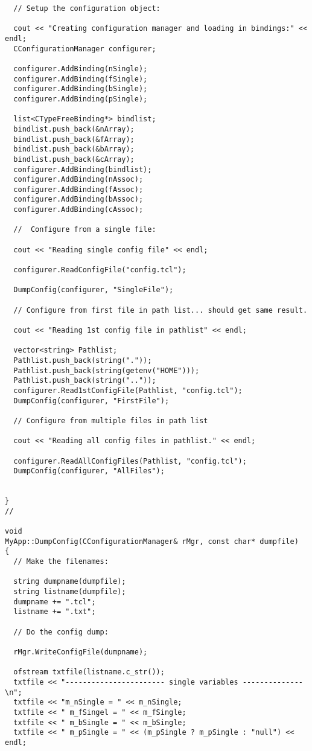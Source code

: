 \begin{verbatim}
  // Setup the configuration object:

  cout << "Creating configuration manager and loading in bindings:" << endl;
  CConfigurationManager configurer;

  configurer.AddBinding(nSingle);
  configurer.AddBinding(fSingle);
  configurer.AddBinding(bSingle);
  configurer.AddBinding(pSingle);

  list<CTypeFreeBinding*> bindlist;
  bindlist.push_back(&nArray);
  bindlist.push_back(&fArray);
  bindlist.push_back(&bArray);
  bindlist.push_back(&cArray);
  configurer.AddBinding(bindlist);
  configurer.AddBinding(nAssoc);
  configurer.AddBinding(fAssoc);
  configurer.AddBinding(bAssoc);
  configurer.AddBinding(cAssoc);

  //  Configure from a single file:

  cout << "Reading single config file" << endl;

  configurer.ReadConfigFile("config.tcl");
 
  DumpConfig(configurer, "SingleFile");

  // Configure from first file in path list... should get same result.

  cout << "Reading 1st config file in pathlist" << endl;

  vector<string> Pathlist;
  Pathlist.push_back(string("."));
  Pathlist.push_back(string(getenv("HOME")));
  Pathlist.push_back(string(".."));
  configurer.Read1stConfigFile(Pathlist, "config.tcl");
  DumpConfig(configurer, "FirstFile");

  // Configure from multiple files in path list

  cout << "Reading all config files in pathlist." << endl;

  configurer.ReadAllConfigFiles(Pathlist, "config.tcl");
  DumpConfig(configurer, "AllFiles");


}
//

void
MyApp::DumpConfig(CConfigurationManager& rMgr, const char* dumpfile)
{
  // Make the filenames:

  string dumpname(dumpfile);
  string listname(dumpfile);
  dumpname += ".tcl";
  listname += ".txt";
  
  // Do the config dump:

  rMgr.WriteConfigFile(dumpname);

  ofstream txtfile(listname.c_str());
  txtfile << "----------------------- single variables --------------\n";
  txtfile << "m_nSingle = " << m_nSingle;
  txtfile << " m_fSingel = " << m_fSingle;
  txtfile << " m_bSingle = " << m_bSingle;
  txtfile << " m_pSingle = " << (m_pSingle ? m_pSingle : "null") << endl;


\end{verbatim}
